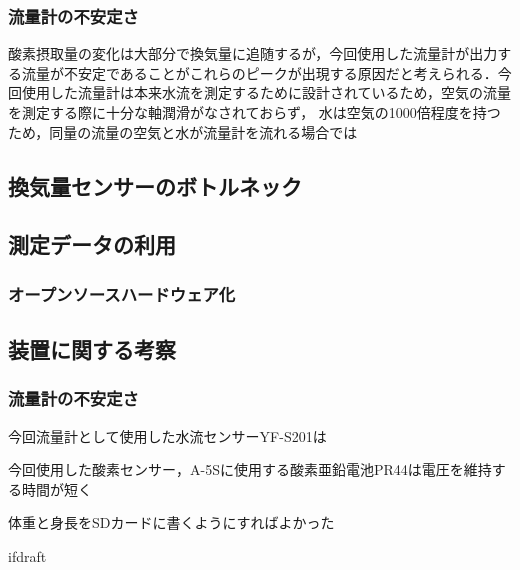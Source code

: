 \subsubsection{流量計の不安定さ}

酸素摂取量の変化は大部分で換気量に追随するが，今回使用した流量計が出力する流量が不安定であることがこれらのピークが出現する原因だと考えられる．今回使用した流量計は本来水流を測定するために設計されているため，空気の流量を測定する際に十分な軸潤滑がなされておらず，
水は空気の1000倍程度を持つため，同量の流量の空気と水が流量計を流れる場合では


\subsection{換気量センサーのボトルネック}

\subsection{測定データの利用}

\subsubsection{オープンソースハードウェア化}

\subsection{装置に関する考察}

\subsubsection{流量計の不安定さ}

今回流量計として使用した水流センサーYF-S201は

今回使用した酸素センサー，A-5Sに使用する酸素亜鉛電池PR44は電圧を維持する時間が短く

体重と身長をSDカードに書くようにすればよかった

\expandafter\ifx\csname ifdraft\endcsname\relax
  
\fi
